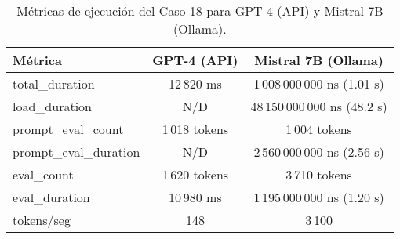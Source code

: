 
\begin{table}[h!]
\centering
\begin{tabular}{|l|c|c|}
\hline
\textbf{Métrica} & \textbf{GPT-4 (API)} & \textbf{Mistral 7B (Ollama)} \\
\hline
total\_duration & 12\,820 ms & 1\,008\,000\,000 ns (1.01 s) \\
load\_duration & N/D & 48\,150\,000\,000 ns (48.2 s) \\
prompt\_eval\_count & 1\,018 tokens & 1\,004 tokens \\
prompt\_eval\_duration & N/D & 2\,560\,000\,000 ns (2.56 s) \\
eval\_count & 1\,620 tokens & 3\,710 tokens \\
eval\_duration & 10\,980 ms & 1\,195\,000\,000 ns (1.20 s) \\
tokens/seg & 148 & 3\,100 \\
\hline
\end{tabular}
\caption{Métricas de ejecución del Caso 18 para GPT-4 (API) y Mistral 7B (Ollama).}
\end{table}
